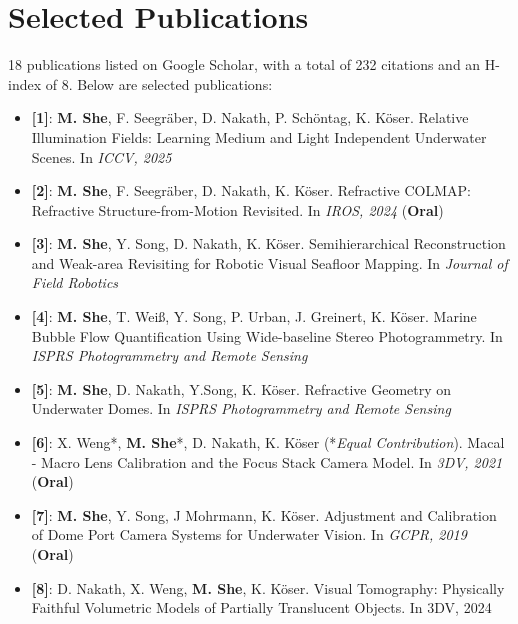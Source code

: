 \documentclass[letterpaper,11pt]{article}
\newcommand{\resumeItem}[2]{
  \item\small{
    \textbf{#1}{: #2 \vspace{-2pt}}
  }
}
\newcommand{\resumeSubHeadingListStart}{\begin{itemize}[leftmargin=*]}
\newcommand{\resumeSubHeadingListEnd}{\end{itemize}}
\begin{document}
\section{Selected Publications}
18 publications listed on Google Scholar, with a total of 232 citations and an H-index of 8. Below are selected publications:
 \resumeSubHeadingListStart
 \resumeItem{[1]}{\textbf{M. She}, F. Seegr\"aber, D. Nakath, P. Sch\"ontag, K. K\"oser. Relative Illumination Fields: Learning Medium and Light Independent Underwater Scenes. In \textit{ICCV, 2025}}
 \resumeItem{[2]}{\textbf{M. She}, F. Seegr\"aber, D. Nakath, K. K\"oser. Refractive COLMAP: Refractive Structure-from-Motion Revisited. In \textit{IROS, 2024} (\textbf{Oral})}
 \resumeItem{[3]}{\textbf{M. She}, Y. Song, D. Nakath, K. K\"oser. Semihierarchical Reconstruction and Weak-area Revisiting for Robotic Visual Seafloor Mapping. In \textit{Journal of Field Robotics}}
 \resumeItem{[4]}{\textbf{M. She}, T. Wei\ss, Y. Song, P. Urban, J. Greinert, K. K\"oser. Marine Bubble Flow Quantification Using Wide-baseline Stereo Photogrammetry. In \textit{ISPRS Photogrammetry and Remote Sensing}}
 \resumeItem{[5]}{\textbf{M. She}, D. Nakath, Y.Song, K. K\"oser. Refractive Geometry on Underwater Domes. In \textit{ISPRS Photogrammetry and Remote Sensing}}
 \resumeItem{[6]}{X. Weng*, \textbf{M. She}*, D. Nakath, K. K\"oser (*\textit{Equal Contribution}). Macal - Macro Lens Calibration and the Focus Stack Camera Model. In \textit{3DV, 2021} (\textbf{Oral})}
 \resumeItem{[7]}{\textbf{M. She}, Y. Song, J Mohrmann, K. K\"oser. Adjustment and Calibration of Dome Port Camera Systems for Underwater Vision. In \textit{GCPR, 2019} (\textbf{Oral})}
 \resumeItem{[8]}{D. Nakath, X. Weng, \textbf{M. She}, K. K\"oser. Visual Tomography: Physically Faithful Volumetric Models of Partially Translucent Objects. In 3DV, 2024}
 \resumeSubHeadingListEnd

%


\end{document}

